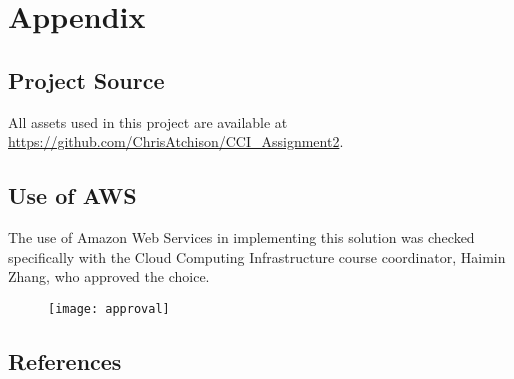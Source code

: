 \appendix

\section{Appendix}

\subsection{Project Source}

All assets used in this project are available at \url{https://github.com/ChrisAtchison/CCI_Assignment2}.

\subsection{Use of AWS}

The use of Amazon Web Services in implementing this solution was checked specifically with the Cloud Computing Infrastructure course coordinator, Haimin Zhang, who approved the choice.

\begin{figure}[H]
    \centering
    \texttt{[image: approval]}
\end{figure}

\subsection{References}

\printbibliography[heading=none]
